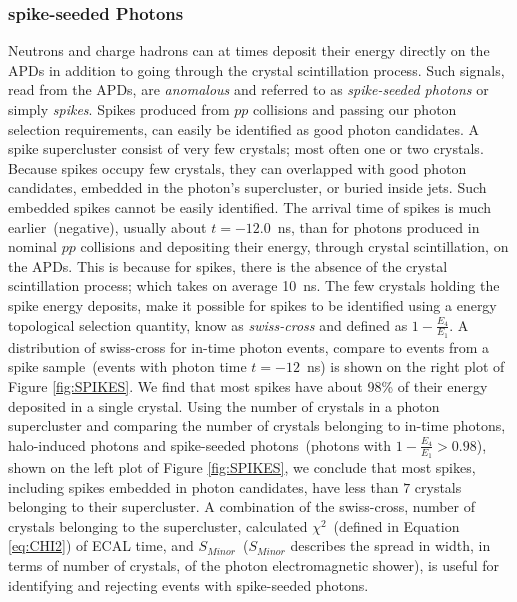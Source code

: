 \subsubsection{spike-seeded Photons}
Neutrons and charge hadrons can at times deposit their energy directly on the APDs in addition to  going through the crystal scintillation process. Such signals, read from the APDs, are \textit{anomalous} and referred to as \textit{spike-seeded photons} or simply \textit{spikes}. Spikes produced from $pp$ collisions and passing our photon selection requirements, can easily be identified as good photon candidates. A spike supercluster consist of very few crystals; most often one or two crystals. Because spikes occupy few crystals, they can overlapped with good photon candidates, embedded in the photon's supercluster, or buried inside jets. Such embedded spikes cannot be easily identified. 
\newline
The arrival time of spikes is much earlier~(negative), usually about $t = -12.0$~ns, than for photons produced in nominal $pp$ collisions and depositing their energy, through crystal scintillation, on the APDs. This is because for spikes, there is the absence of the crystal scintillation process; which takes on average 10~ns. The few crystals holding the spike energy deposits, make it possible for spikes to be identified using a energy topological selection quantity, know as \textit{swiss-cross} and defined as  $1-\frac{E_{4}}{E_{1}}$. A distribution of swiss-cross for in-time photon events, compare to events from a spike sample~(events with photon time $t = -12$~ns) is shown on the right plot of Figure \ref{fig:SPIKES}. We find that most spikes have about 98\% of their energy deposited in a single crystal.
\newline
Using the number of crystals in a photon supercluster and comparing the number of crystals belonging to in-time photons, halo-induced photons and spike-seeded photons~(photons with $1-\frac{E_{4}}{E_{1}} > 0.98$), shown on the left plot of Figure \ref{fig:SPIKES}, we conclude that most spikes, including spikes embedded in photon candidates, have less than $7$ crystals belonging to their supercluster. A combination of the swiss-cross, number of crystals belonging to the supercluster, calculated $\chi^{2}$~(defined in Equation \ref{eq:CHI2}) of ECAL time, and $ S_{Minor}$~($ S_{Minor}$ describes the spread in width, in terms of number of crystals, of the photon electromagnetic shower), is useful for identifying and rejecting events with spike-seeded photons.

